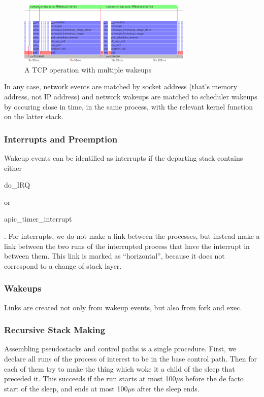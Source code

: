 \documentclass[10pt]{article}
\begin{document}
\begin{figure}[h]
\includegraphics[width=3.25in]{tcpexample}
\caption{A TCP operation with multiple wakeups}
\label{fig:tcp}
\end{figure}

In any case, network events are matched by socket address (that's memory address, not IP address) and network wakeups are matched to scheduler wakeups by occuring close in time, in the same process, with the relevant kernel function on the latter stack.

\subsubsection{Interrupts and Preemption}

Wakeup events can be identified as interrupts if the departing stack contains either \begin{tt}do\_IRQ\end{tt} or\\ \begin{tt}apic\_timer\_interrupt\end{tt}.  For interrupts, we do not make a link between the processes, but instead make a link between the two runs of the interrupted process that have the interrupt in between them.  This link is marked as ``horizontal'', because it does not correspond to a change of stack layer.

\subsubsection{Wakeups}

Links are created not only from wakeup events, but also from fork and exec.

\subsubsection{Recursive Stack Making}

Assembling pseudostacks and control paths is a single procedure.  First, we declare all runs of the process of interest to be in the base control path.  Then for each of them try to make the thing which woke it a child of the sleep that preceded it.  This succeeds if the run starts at most 100$\mu$s before the de facto start of the sleep, and ends at most 100$\mu$s after the sleep ends.  
\end{document}
